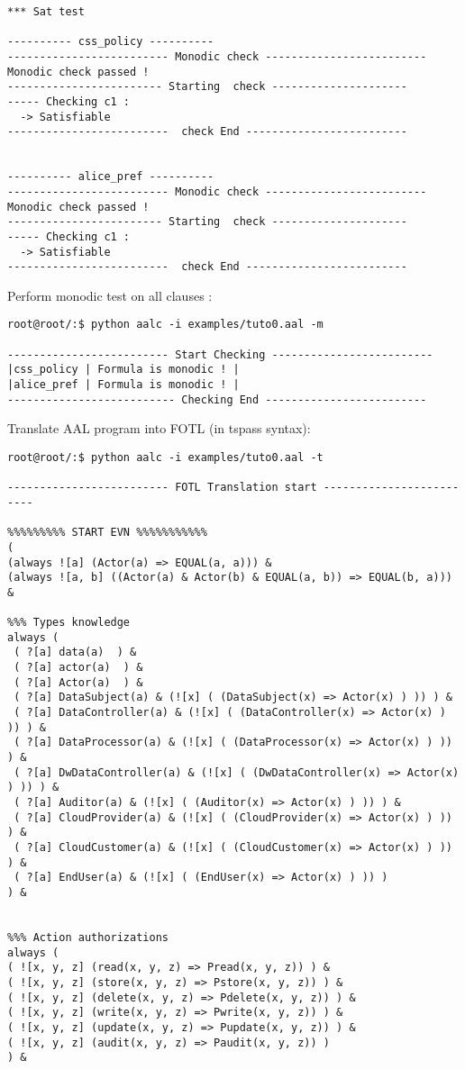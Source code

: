 \begin{itemize}
{\begin{lstlisting}
*** Sat test

---------- css_policy ----------
------------------------- Monodic check -------------------------
Monodic check passed !
------------------------ Starting  check ---------------------
----- Checking c1 :
  -> Satisfiable
-------------------------  check End -------------------------


---------- alice_pref ----------
------------------------- Monodic check -------------------------
Monodic check passed !
------------------------ Starting  check ---------------------
----- Checking c1 :
  -> Satisfiable
-------------------------  check End -------------------------
\end{lstlisting}


	\item Perform monodic test on all clauses :
\begin{lstlisting}
root@root/:$ python aalc -i examples/tuto0.aal -m

------------------------- Start Checking -------------------------
|css_policy | Formula is monodic ! |
|alice_pref | Formula is monodic ! |
-------------------------- Checking End -------------------------
\end{lstlisting}


	\item Translate AAL program into FOTL (in tspass syntax):
\begin{lstlisting}
root@root/:$ python aalc -i examples/tuto0.aal -t

------------------------- FOTL Translation start -------------------------

%%%%%%%%% START EVN %%%%%%%%%%%
(
(always ![a] (Actor(a) => EQUAL(a, a))) &
(always ![a, b] ((Actor(a) & Actor(b) & EQUAL(a, b)) => EQUAL(b, a))) &

%%% Types knowledge
always (
 ( ?[a] data(a)  ) &
 ( ?[a] actor(a)  ) &
 ( ?[a] Actor(a)  ) &
 ( ?[a] DataSubject(a) & (![x] ( (DataSubject(x) => Actor(x) ) )) ) &
 ( ?[a] DataController(a) & (![x] ( (DataController(x) => Actor(x) ) )) ) &
 ( ?[a] DataProcessor(a) & (![x] ( (DataProcessor(x) => Actor(x) ) )) ) &
 ( ?[a] DwDataController(a) & (![x] ( (DwDataController(x) => Actor(x) ) )) ) &
 ( ?[a] Auditor(a) & (![x] ( (Auditor(x) => Actor(x) ) )) ) &
 ( ?[a] CloudProvider(a) & (![x] ( (CloudProvider(x) => Actor(x) ) )) ) &
 ( ?[a] CloudCustomer(a) & (![x] ( (CloudCustomer(x) => Actor(x) ) )) ) &
 ( ?[a] EndUser(a) & (![x] ( (EndUser(x) => Actor(x) ) )) )
) &


%%% Action authorizations
always (
( ![x, y, z] (read(x, y, z) => Pread(x, y, z)) ) &
( ![x, y, z] (store(x, y, z) => Pstore(x, y, z)) ) &
( ![x, y, z] (delete(x, y, z) => Pdelete(x, y, z)) ) &
( ![x, y, z] (write(x, y, z) => Pwrite(x, y, z)) ) &
( ![x, y, z] (update(x, y, z) => Pupdate(x, y, z)) ) &
( ![x, y, z] (audit(x, y, z) => Paudit(x, y, z)) )
) &



\end{lstlisting}}
\end{itemize}
